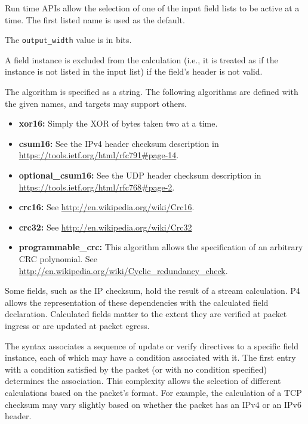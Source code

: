 \documentclass[12pt]{article}
\begin{document}
Run time APIs allow the selection of one of the input field lists to
be active at a time. The first listed name is used as the default.

The \texttt{output_width} value is in bits.

A field instance is excluded from the calculation (i.e., it is treated as 
if the instance is not listed in the input list) if the field's header 
is not valid.

The algorithm is specified as a string.  The following algorithms are
defined with the given names, and targets may support others.

\begin{itemize}
\item
\textbf{xor16:} Simply the XOR of bytes taken two at a time.
\item
\textbf{csum16:} See the IPv4 header checksum description in \\
\url{https://tools.ietf.org/html/rfc791\#page-14}.
\item
\textbf{optional_csum16:} See the UDP header checksum description in \\
\url{https://tools.ietf.org/html/rfc768#page-2}.
\item
\textbf{crc16:} See \url{http://en.wikipedia.org/wiki/Crc16}.
\item
\textbf{crc32:} See \url{http://en.wikipedia.org/wiki/Crc32}
\item
\textbf{programmable_crc:}  This algorithm allows the specification 
of an arbitrary CRC polynomial.  See
\url{http://en.wikipedia.org/wiki/Cyclic_redundancy_check}.
\end{itemize}


Some fields, such as the IP checksum, hold the result of a stream
calculation.  P4 allows the representation of these dependencies with
the calculated field declaration. Calculated fields matter to the
extent they are verified at packet ingress or are updated at packet
egress.

The syntax associates a sequence of update or verify directives to a
specific field instance, each of which may have a condition associated
with it. The first entry with a condition satisfied by the packet (or
with no condition specified) determines the association. This
complexity allows the selection of different calculations based on the
packet's format. For example, the calculation of a TCP checksum may
vary slightly based on whether the packet has an IPv4 or an IPv6
header.
\end{document}
